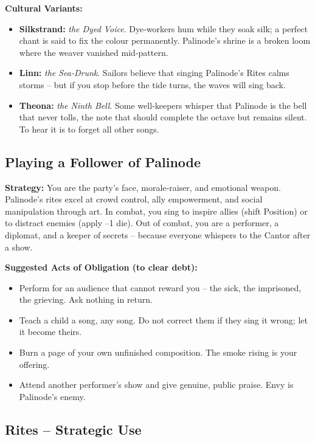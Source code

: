 \documentclass[10pt,a5paper]{book}
\begin{document}
\textbf{Cultural Variants:}
\begin{itemize}
    \item \textbf{Silkstrand:} \textit{the Dyed Voice}. Dye‑workers hum while they soak silk; a perfect chant is said to fix the colour permanently. Palinode’s shrine is a broken loom where the weaver vanished mid‑pattern.
    \item \textbf{Linn:} \textit{the Sea‑Drunk}. Sailors believe that singing Palinode’s Rites calms storms – but if you stop before the tide turns, the waves will sing back.
    \item \textbf{Theona:} \textit{the Ninth Bell}. Some well‑keepers whisper that Palinode is the bell that never tolls, the note that should complete the octave but remains silent. To hear it is to forget all other songs.
\end{itemize}

\subsection*{Playing a Follower of Palinode}

\textbf{Strategy:} You are the party’s face, morale‑raiser, and emotional weapon. Palinode’s rites excel at crowd control, ally empowerment, and social manipulation through art. In combat, you sing to inspire allies (shift Position) or to distract enemies (apply –1 die). Out of combat, you are a performer, a diplomat, and a keeper of secrets – because everyone whispers to the Cantor after a show.

\textbf{Suggested Acts of Obligation (to clear debt):}
\begin{itemize}
    \item Perform for an audience that cannot reward you – the sick, the imprisoned, the grieving. Ask nothing in return.
    \item Teach a child a song, any song. Do not correct them if they sing it wrong; let it become theirs.
    \item Burn a page of your own unfinished composition. The smoke rising is your offering.
    \item Attend another performer’s show and give genuine, public praise. Envy is Palinode’s enemy.
\end{itemize}

\subsection*{Rites – Strategic Use}
\end{document}
